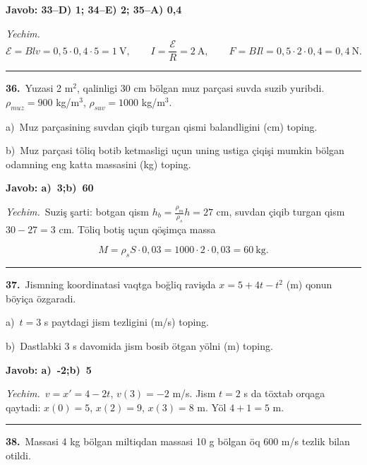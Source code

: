 \documentclass[11pt,a4paper]{article}
\begin{document}
\noindent\colorbox{gray!12}{\parbox{\dimexpr\linewidth-2\fboxsep}{\textbf{Javob: 33--D) 1; 34--E) 2; 35--A) 0,4}}}\par\smallskip
\noindent\textit{Yechim.}\ \[\mathcal E=Blv=0{,}5\cdot0{,}4\cdot5=1\ \text{V},\qquad I=\frac{\mathcal E}{R}=2\ \text{A},\qquad F=BIl=0{,}5\cdot2\cdot0{,}4=0{,}4\ \text{N}.\]\par\medskip\hrule\medskip
{}\noindent\textbf{36.}\ Yuzasi 2 m$^2$, qalinligi 30 cm bölgan muz parçasi suvda suzib yuribdi. $\rho_{muz}=900$ kg/m$^3$, $\rho_{suv}=1000$ kg/m$^3$.\par
\noindent\hspace*{4mm}a)\ Muz parçasining suvdan çiqib turgan qismi balandligini (cm) toping.\par
\noindent\hspace*{4mm}b)\ Muz parçasi töliq botib ketmasligi uçun uning ustiga çiqişi mumkin bölgan odamning eng katta massasini (kg) toping.\par
\noindent\colorbox{gray!12}{\parbox{\dimexpr\linewidth-2\fboxsep}{\textbf{Javob: a)\ 3;\quad b)\ 60}}}\par\smallskip
\noindent\textit{Yechim.}\ Suziş şarti: botgan qism $h_b=\frac{\rho_m}{\rho_s}h=27$ cm, suvdan çiqib turgan qism $30-27=3$ cm. Töliq botiş uçun qöşimça massa\par
\[M=\rho_sS\cdot0{,}03=1000\cdot2\cdot0{,}03=60\ \text{kg}.\]\par\medskip\hrule\medskip
{}\noindent\textbf{37.}\ Jismning koordinatasi vaqtga boğliq ravişda $x=5+4t-t^2$ (m) qonun böyiça özgaradi.\par
\noindent\hspace*{4mm}a)\ $t=3$ s paytdagi jism tezligini (m/s) toping.\par
\noindent\hspace*{4mm}b)\ Dastlabki 3 s davomida jism bosib ötgan yölni (m) toping.\par
\noindent\colorbox{gray!12}{\parbox{\dimexpr\linewidth-2\fboxsep}{\textbf{Javob: a)\ -2;\quad b)\ 5}}}\par\smallskip
\noindent\textit{Yechim.}\ $v=x'=4-2t$, $v(3)=-2$ m/s. Jism $t=2$ s da töxtab orqaga qaytadi: $x(0)=5$, $x(2)=9$, $x(3)=8$ m. Yöl $4+1=5$ m.\par\par\medskip\hrule\medskip
{}\noindent\textbf{38.}\ Massasi 4 kg bölgan miltiqdan massasi 10 g bölgan öq 600 m/s tezlik bilan otildi.\par
\end{document}
